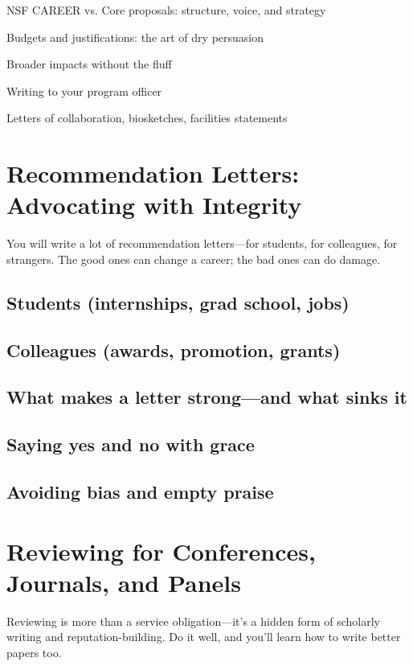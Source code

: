 \documentclass[oneside,11pt,dvipsnames]{book}
\begin{document}
NSF CAREER vs. Core proposals: structure, voice, and strategy

Budgets and justifications: the art of dry persuasion

Broader impacts without the fluff

Writing to your program officer

Letters of collaboration, biosketches, facilities statements

\chapter{Recommendation Letters: Advocating with Integrity}

You will write a lot of recommendation letters—for students, for colleagues, for strangers. The good ones can change a career; the bad ones can do damage.

\section{Students (internships, grad school, jobs)}

\section{Colleagues (awards, promotion, grants)}

\section{What makes a letter strong—and what sinks it}

\section{Saying yes and no with grace}

\section{Avoiding bias and empty praise}

\chapter{Reviewing for Conferences, Journals, and Panels}

Reviewing is more than a service obligation—it’s a hidden form of scholarly writing and reputation-building. Do it well, and you’ll learn how to write better papers too.
\end{document}
